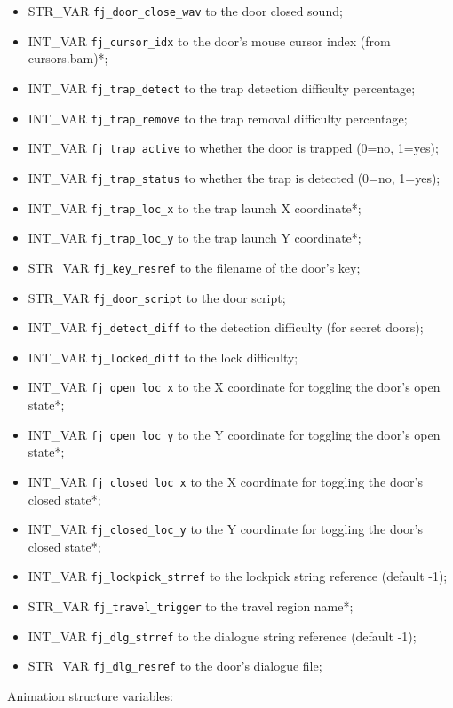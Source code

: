 \documentclass{article}
\begin{document}
\begin{itemize}
\item STR_VAR \verb+fj_door_close_wav+ to the door closed sound;
\item INT_VAR \verb+fj_cursor_idx+ to the door's mouse cursor index (from cursors.bam)*;
\item INT_VAR \verb+fj_trap_detect+ to the trap detection difficulty percentage;
\item INT_VAR \verb+fj_trap_remove+ to the trap removal difficulty percentage;
\item INT_VAR \verb+fj_trap_active+ to whether the door is trapped (0=no, 1=yes);
\item INT_VAR \verb+fj_trap_status+ to whether the trap is detected (0=no, 1=yes);
\item INT_VAR \verb+fj_trap_loc_x+ to the trap launch X coordinate*;
\item INT_VAR \verb+fj_trap_loc_y+ to the trap launch Y coordinate*;
\item STR_VAR \verb+fj_key_resref+ to the filename of the door's key;
\item STR_VAR \verb+fj_door_script+ to the door script;
\item INT_VAR \verb+fj_detect_diff+ to the detection difficulty (for secret doors);
\item INT_VAR \verb+fj_locked_diff+ to the lock difficulty;
\item INT_VAR \verb+fj_open_loc_x+ to the X coordinate for toggling the door's open state*;
\item INT_VAR \verb+fj_open_loc_y+ to the Y coordinate for toggling the door's open state*;
\item INT_VAR \verb+fj_closed_loc_x+ to the X coordinate for toggling the door's closed state*;
\item INT_VAR \verb+fj_closed_loc_y+ to the Y coordinate for toggling the door's closed state*;
\item INT_VAR \verb+fj_lockpick_strref+ to the lockpick string reference (default -1);
\item STR_VAR \verb+fj_travel_trigger+ to the travel region name*;
\item INT_VAR \verb+fj_dlg_strref+ to the dialogue string reference (default -1);
\item STR_VAR \verb+fj_dlg_resref+ to the door's dialogue file;
\end{itemize}
Animation structure variables:
\end{document}
